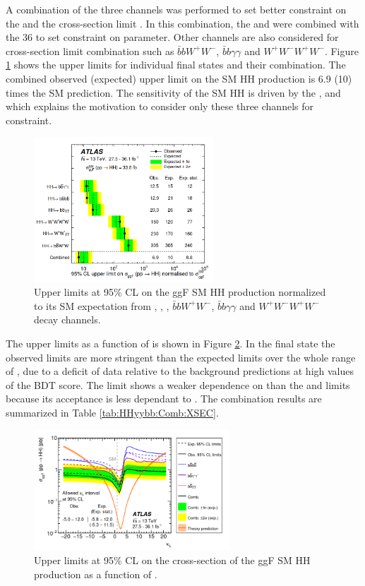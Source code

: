 A combination of the three channels was performed to set better constraint on the \kl and the cross-section limit \cite{HH_Comb_36}. In this combination, the \bbbb and \bbtt were combined with the 36 \ifb \bbyy to set constraint on \kl parameter. Other channels are also considered for cross-section limit combination such as $\bar{b}bW^+W^-$, $\bar{b}b\gamma\gamma$ and $W^+W^-W^+W^-$. Figure \ref{fig:HHyybb:comb:xsec} shows the upper limits for individual final states and their combination. The combined observed (expected) upper limit on the SM HH production is 6.9 (10) times the SM prediction. The sensitivity of the SM HH is driven by the \bbbb, \bbtt and \bbyy which explains the motivation to consider only these three channels for \kl constraint. 
\begin{figure}[htbp]
    \centering
    \includegraphics[width=0.6\textwidth]{Ch1/Img/XSec_Comb_36.png}
    \caption{Upper limits at 95\% CL on the ggF SM HH production normalized to its SM expectation from \bbtt, \bbbb, \bbyy, $\bar{b}bW^+W^-$, $\bar{b}b\gamma\gamma$ and $W^+W^-W^+W^-$ decay channels.}
    \label{fig:HHyybb:comb:xsec}
\end{figure}

The upper limits as a function of \kl is shown in Figure \ref{fig:HHyybb:comb:kl}. In the \bbtt final state the observed limits are more stringent than the expected limits over the whole range of \kl, due to a deficit of data relative to the background predictions at high values of the BDT score. The \bbyy limit shows a weaker dependence on \kl than the \bbbb and \bbtt limits because its acceptance is less dependant to \kl. The combination results are summarized in Table \ref{tab:HHyybb:Comb:XSEC}.

\begin{figure}[htbp]
    \centering
    \includegraphics[width=0.65\textwidth]{Ch1/Img/Klambda_Comb_36.png}
    \caption{Upper limits at 95\% CL on the cross-section of the ggF SM HH production as a function of \kl.}
    \label{fig:HHyybb:comb:kl}
\end{figure}

